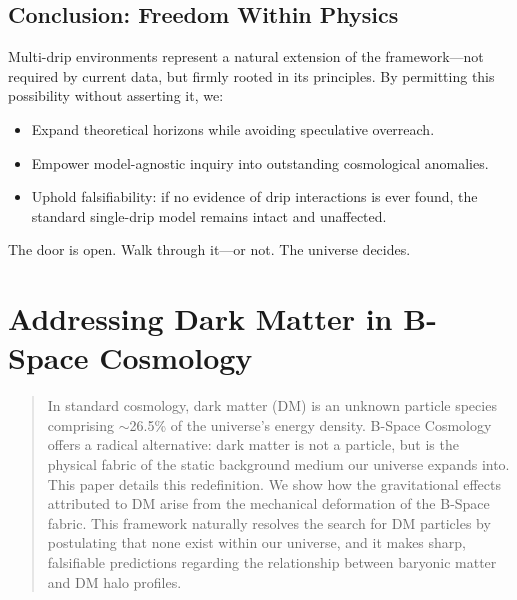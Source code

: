 \documentclass{BSpacePaper} %
\begin{document}
\begin{appendices}
\subsection{Conclusion: Freedom Within Physics}
Multi-drip environments represent a natural extension of the \bspace{} framework—not required by current data, but firmly rooted in its principles. By permitting this possibility without asserting it, we:
\begin{itemize}
    \item Expand theoretical horizons while avoiding speculative overreach.
    \item Empower model-agnostic inquiry into outstanding cosmological anomalies.
    \item Uphold falsifiability: if no evidence of drip interactions is ever found, the standard single-drip model remains intact and unaffected.
\end{itemize}
The door is open. Walk through it—or not. The universe decides.

\clearpage

\section{Addressing Dark Matter in B-Space Cosmology}
\label{app:dm}
\setcounter{equation}{0}
\setcounter{table}{0}

\begin{abstract}
\noindent
In standard cosmology, dark matter (DM) is an unknown particle species comprising $\sim$26.5\% of the universe's energy density. B-Space Cosmology offers a radical alternative: dark matter is not a particle, but is the physical fabric of the static background medium our universe expands into. This paper details this redefinition. We show how the gravitational effects attributed to DM arise from the mechanical deformation of the B-Space fabric. This framework naturally resolves the search for DM particles by postulating that none exist within our universe, and it makes sharp, falsifiable predictions regarding the relationship between baryonic matter and DM halo profiles.
\end{abstract}


\end{appendices}
\end{document}

